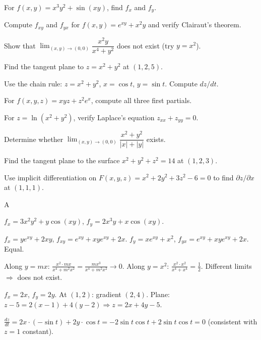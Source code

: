 \documentclass[11pt]{article}
\begin{document}
\begin{problems}
\item For $f(x,y) = x^3 y^2 + \sin(xy)$, find $f_x$ and $f_y$.
\item Compute $f_{xy}$ and $f_{yx}$ for $f(x,y) = e^{x y} + x^2 y$ and verify Clairaut's theorem.
\item Show that $\displaystyle \lim_{(x,y) \to (0,0)} \dfrac{x^2 y}{x^4 + y^2}$ does not exist (try $y = x^2$).
\item Find the tangent plane to $z = x^2 + y^2$ at $(1, 2, 5)$.
\item Use the chain rule: $z = x^2 + y^2$, $x = \cos t$, $y = \sin t$. Compute $dz/dt$.
\end{problems}

\vfill
\newpage
{}
\begin{problems}
\item For $f(x,y,z) = x y z + z^2 e^x$, compute all three first partials.
\item For $z = \ln(x^2 + y^2)$, verify Laplace's equation $z_{xx} + z_{yy} = 0$.
\item Determine whether $\displaystyle \lim_{(x,y)\to(0,0)} \dfrac{x^2 + y^2}{|x| + |y|}$ exists.
\item Find the tangent plane to the surface $x^2 + y^2 + z^2 = 14$ at $(1, 2, 3)$.
\item Use implicit differentiation on $F(x,y,z) = x^2 + 2y^2 + 3z^2 - 6 = 0$ to find $\partial z/\partial x$ at $(1,1,1)$.
\end{problems}

\vfill
\newpage
{}

\begin{answers}{A}
\item $f_x = \boxed{3x^2 y^2 + y \cos(xy)}$, $f_y = \boxed{2 x^3 y + x \cos(xy)}$.
\item $f_x = y e^{xy} + 2xy$, $f_{xy} = e^{xy} + xy e^{xy} + 2x$. $f_y = x e^{xy} + x^2$, $f_{yx} = e^{xy} + xy e^{xy} + 2x$. Equal. \checkmark
\item Along $y = m x$: $\tfrac{x^2 \cdot mx}{x^4 + m^2 x^2} = \tfrac{mx^3}{x^4 + m^2 x^2} \to 0$. Along $y = x^2$: $\tfrac{x^2 \cdot x^2}{x^4 + x^4} = \tfrac{1}{2}$. Different limits $\Rightarrow$ does not exist.
\item $f_x = 2x$, $f_y = 2y$. At $(1,2)$: gradient $(2,4)$. Plane: $z - 5 = 2(x-1) + 4(y-2) \Rightarrow \boxed{z = 2x + 4y - 5}$.
\item $\tfrac{dz}{dt} = 2x \cdot (-\sin t) + 2y \cdot \cos t = -2\sin t \cos t + 2\sin t \cos t = \boxed{0}$ (consistent with $z = 1$ constant).
\end{answers}
\end{document}
